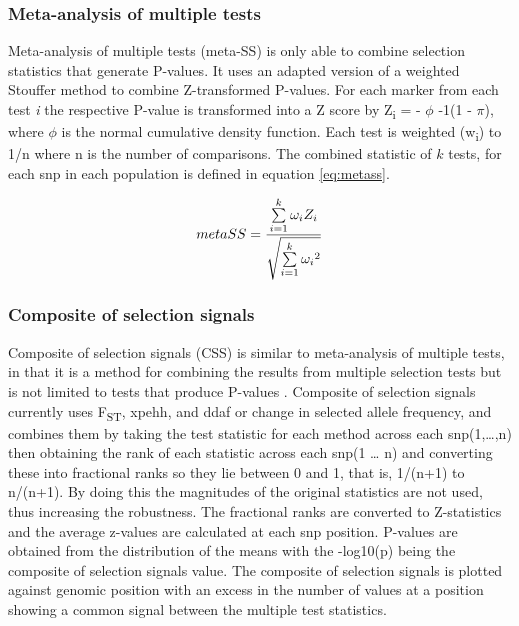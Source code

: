 \documentclass[]{report}
\begin{document}
\subsubsection{Meta-analysis of multiple
tests}\label{meta-analysis-of-multiple-tests}

Meta-analysis of multiple tests (meta-SS)
\citep{Utsunomiya2013, Utsunomiya2015} is only able to combine selection
statistics that generate P-values. It uses an adapted version of a
weighted Stouffer method \citep{stouffer1949american, Zaykin2011} to
combine Z-transformed P-values. For each marker from each test \emph{i}
the respective P-value is transformed into a Z score by
Z\textsubscript{i} = - \(\phi\) -1(1 - \(\pi\)), where \(\phi\) is the
normal cumulative density function. Each test is weighted
(w\textsubscript{i}) to 1/n where n is the number of comparisons. The
combined statistic of \(k\) tests, for each \gls{snp} in each population
is defined in equation \eqref{eq:metass}.

\begin{equation} 
meta\-SS = \frac{\sum\limits_{i =1}^k {\omega_i Z_i}}{\sqrt{\sum\limits_{i =1}^k {\omega_i}^2}}
\label{eq:metass}
\end{equation}

\subsubsection{Composite of selection
signals}\label{composite-of-selection-signals}

Composite of selection signals (CSS) is similar to meta-analysis of
multiple tests, in that it is a method for combining the results from
multiple selection tests but is not limited to tests that produce
P-values \citep{Randhawa2014}. Composite of selection signals currently
uses F\textsubscript{ST}, \gls{xpehh}, and \gls{ddaf} or change in
selected allele frequency, and combines them by taking the test
statistic for each method across each \gls{snp}(1,\ldots{},n) then
obtaining the rank of each statistic across each \gls{snp}(1 \ldots{} n)
and converting these into fractional ranks so they lie between 0 and 1,
that is, 1/(n+1) to n/(n+1). By doing this the magnitudes of the
original statistics are not used, thus increasing the robustness. The
fractional ranks are converted to Z-statistics and the average z-values
are calculated at each \gls{snp} position. P-values are obtained from
the distribution of the means with the -log10(p) being the composite of
selection signals value. The composite of selection signals is plotted
against genomic position with an excess in the number of values at a
position showing a common signal between the multiple test statistics.
\end{document}
